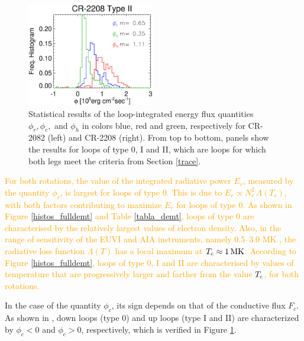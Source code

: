 \documentclass[namedreferences]{solarphysics}
\newcommand{\MK}{{\rm MK}}
\newcommand{\Tc}{T_{\rm c}}
\def\albert#1{\textcolor{orange}{#1}}
\begin{document}
\begin{article}
\begin{figure}[ht]
\begin{center}
\includegraphics[width=0.495\textwidth]{figs/histocr2208_cgenergia.eps}
\caption{{Statistical results of the loop-integrated energy flux quantities $\phi_r,\phi_c,$ and $\phi_h$ in colors blue, red and green, respectively for CR-2082 (left) and CR-2208 (right). From top to bottom, panels show the results for loops of type 0, I and II, which are loops for which both legs meet the criteria from Section \ref{trace}.}}
\label{energia_demt}
\end{center}
\end{figure} 

\albert{For both rotations, the value of the integrated radiative power $E_r$, measured by the quantity $\phi_r$, is largest for loops of type 0. This is due to $E_r\propto N_e^2\,\Lambda(T_e)$, with both factors contributing to maximize $E_r$ for loops of type 0. As shown in Figure \ref{histos_fulldemt} and Table \ref{tabla_demt}, loops of type 0 are characterised by the relatively largest values of electron density. Also, in the range of sensitivity of the EUVI and AIA instruments, namely 0.5–3.0 MK \citep{nuevo_2015}, the radiative loss function $\Lambda(T)$ has a local maximum at $\Tc\approx 1\,\MK$. According to Figure \ref{histos_fulldemt}, loops of type 0, I and II are characterised by \albert{values of temperature that are progressively larger and farther} from the value $\Tc$, for both rotations.}

{In the case of the quantity $\phi_c$, its sign depends on that of the conductive flux $F_c$. As shown in \citet{maccormack_2017}, down loops (type 0) and up loops (type I and II) are characterized by $\phi_c<0$ and $\phi_c>0$, respectively, which is verified in Figure \ref{energia_demt}.}


\end{article}
\end{document}
